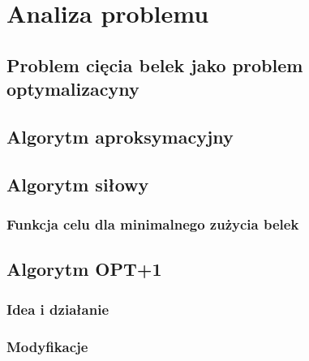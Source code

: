 \chapter{Analiza problemu}
\thispagestyle{chapterBeginStyle}


\section{Problem cięcia belek jako problem optymalizacyny}


\section{Algorytm aproksymacyjny}


\section{Algorytm siłowy}
\subsection{Funkcja celu dla minimalnego zużycia belek}


\section{Algorytm OPT+1}
\subsection{Idea i działanie}
\subsection{Modyfikacje}

